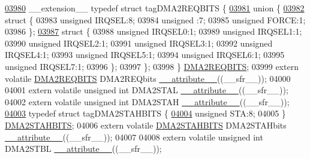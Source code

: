 \begin{DoxyCode}
\hypertarget{a00009_source_l03980}{}\hyperlink{a00008}{03980} \_\_extension\_\_ \textcolor{keyword}{typedef} \textcolor{keyword}{struct }tagDMA2REQBITS \{
\hypertarget{a00009_source_l03981}{}\hyperlink{a00009}{03981}   \textcolor{keyword}{union }\{
\hypertarget{a00009_source_l03982}{}\hyperlink{a00009}{03982}     \textcolor{keyword}{struct }\{
03983       \textcolor{keywordtype}{unsigned} IRQSEL:8;
03984       \textcolor{keywordtype}{unsigned} :7;
03985       \textcolor{keywordtype}{unsigned} FORCE:1;
03986     \};
\hypertarget{a00009_source_l03987}{}\hyperlink{a00009}{03987}     \textcolor{keyword}{struct }\{
03988       \textcolor{keywordtype}{unsigned} IRQSEL0:1;
03989       \textcolor{keywordtype}{unsigned} IRQSEL1:1;
03990       \textcolor{keywordtype}{unsigned} IRQSEL2:1;
03991       \textcolor{keywordtype}{unsigned} IRQSEL3:1;
03992       \textcolor{keywordtype}{unsigned} IRQSEL4:1;
03993       \textcolor{keywordtype}{unsigned} IRQSEL5:1;
03994       \textcolor{keywordtype}{unsigned} IRQSEL6:1;
03995       \textcolor{keywordtype}{unsigned} IRQSEL7:1;
03996     \};
03997   \};
03998 \} \hyperlink{a00008_d9/d72/a00412}{DMA2REQBITS};
03999 \textcolor{keyword}{extern} \textcolor{keyword}{volatile} \hyperlink{a00008_d9/d72/a00412}{DMA2REQBITS} DMA2REQbits \hyperlink{a00009_a493c46f03454991ccc5aa7a6e1dfb2a7}{\_\_attribute\_\_}((\_\_sfr\_\_));
04000 
04001 \textcolor{keyword}{extern} \textcolor{keyword}{volatile} \textcolor{keywordtype}{unsigned} \textcolor{keywordtype}{int}  DMA2STAL \hyperlink{a00009_a493c46f03454991ccc5aa7a6e1dfb2a7}{\_\_attribute\_\_}((\_\_sfr\_\_));
04002 \textcolor{keyword}{extern} \textcolor{keyword}{volatile} \textcolor{keywordtype}{unsigned} \textcolor{keywordtype}{int}  DMA2STAH \hyperlink{a00009_a493c46f03454991ccc5aa7a6e1dfb2a7}{\_\_attribute\_\_}((\_\_sfr\_\_));
\hypertarget{a00009_source_l04003}{}\hyperlink{a00008}{04003} \textcolor{keyword}{typedef} \textcolor{keyword}{struct }tagDMA2STAHBITS \{
\hypertarget{a00009_source_l04004}{}\hyperlink{a00008_a0eec78ddd2c12af678d5fab70fe62d14}{04004}   \textcolor{keywordtype}{unsigned} STA:8;
04005 \} \hyperlink{a00008_d0/dd6/a00415}{DMA2STAHBITS};
04006 \textcolor{keyword}{extern} \textcolor{keyword}{volatile} \hyperlink{a00008_d0/dd6/a00415}{DMA2STAHBITS} DMA2STAHbits \hyperlink{a00009_a493c46f03454991ccc5aa7a6e1dfb2a7}{\_\_attribute\_\_}((\_\_sfr\_\_));
04007 
04008 \textcolor{keyword}{extern} \textcolor{keyword}{volatile} \textcolor{keywordtype}{unsigned} \textcolor{keywordtype}{int}  DMA2STBL \hyperlink{a00009_a493c46f03454991ccc5aa7a6e1dfb2a7}{\_\_attribute\_\_}((\_\_sfr\_\_));

\end{DoxyCode}
